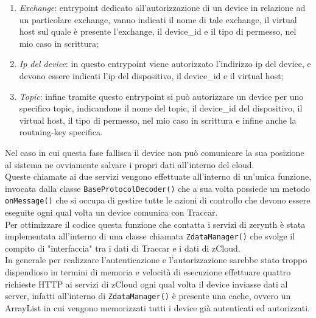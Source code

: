 \documentclass[a4paper,titlepage,12pt]{book}
\begin{document}
{\begin{enumerate}
\item \textit{Exchange}: entrypoint dedicato all'autorizzazione di un device in relazione ad un particolare exchange, vanno indicati il nome di tale exchange, il virtual host sul quale è presente l'exchange, il device\_id e il tipo di permesso, nel mio caso in scrittura;

\item \textit{Ip del device}: in questo entrypoint viene autorizzato l'indirizzo ip del device, e devono essere indicati l'ip del dispositivo, il device\_id e il virtual host;

\item \textit{Topic}: infine tramite questo entrypoint si può autorizzare un device per uno specifico topic, indicandone il nome del topic, il device\_id del dispositivo, il virtual host, il tipo di permesso, nel mio caso in scrittura e infine anche la routning-key specifica.

\end{enumerate}


Nel caso in cui questa fase fallisca il device non può comunicare la sua posizione al sistema ne ovviamente salvare i propri dati all'interno del cloud. \\
Queste chiamate ai due servizi vengono effettuate all'interno di un'unica funzione, invocata dalla classe \texttt{BaseProtocolDecoder()} che a sua volta possiede un metodo \texttt{onMessage()} che si occupa di gestire tutte le azioni di controllo che devono essere eseguite ogni qual volta un device comunica con Traccar.\\
Per ottimizzare il codice questa funzione che contatta i servizi di zerynth è stata implementata all'interno di una classe chiamata \texttt{ZdataManager()} che svolge il compito di "interfaccia" tra i dati di Traccar e i dati di zCloud. \\
In generale per realizzare l'autenticazione e l'autorizzazione sarebbe stato troppo dispendioso  in termini di memoria e velocità di esecuzione effettuare quattro richieste HTTP ai servizi di zCloud ogni qual volta il device inviasse dati al server, infatti all'interno di \texttt{ZdataManager()} è presente una cache, ovvero un ArrayList in cui vengono memorizzati tutti i device già autenticati ed autorizzati. 

}
\end{document}
